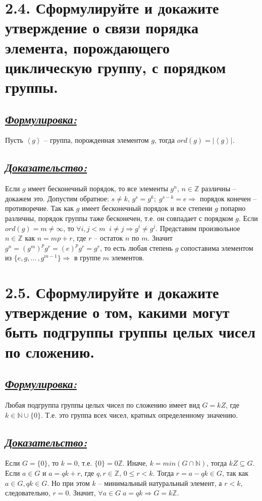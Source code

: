 \documentclass{article}
\begin{document}
\section*{\LARGE 2.4. Сформулируйте и докажите утверждение о связи порядка элемента, порождающего циклическую группу, с порядком группы.}
\subsection*{\Large \underline{\textit{Формулировка: }}}
Пусть $\left<g\right>$ -- группа, порожденная элементом $g$, тогда $ord(g) = |\left<g\right>|$.

\subsection*{\Large \underline{\textit{Доказательство: }}}
Если $g$ имеет бесконечный порядок, то все элементы $g^n,\, n \in \mathbb{Z}$ различны -- докажем это. Допустим обратное: $s \ne k,\, g^s = g^k;\; g^{s - k} = e \Rightarrow$ порядок конечен -- противоречие. Так как $g$ имеет бесконечный порядок и все степени $g$ попарно различны, порядок группы таже бесконечен, т.е. он совпадает с порядком $g$.
\newline Если $ord(g) = m \ne \infty$, то $\forall i, j < m \;\; i \ne j \Rightarrow g^i \ne g^j$. Представим произвольное $n \in \mathbb{Z}$ как $n = mp + r$, где $r$ -- остаток $n$ по $m$. Значит $g^n = (g^m)^pg^r = (e)^pg^r = g^r$, то есть любая степень $g$ сопоставима элементом из $\{e, g, ...\,, g^{m - 1}\} \Rightarrow$ в группе $m$ элементов.

\section*{\LARGE 2.5. Сформулируйте и докажите утверждение о том, какими могут быть подгруппы группы целых чисел по сложению. }
\subsection*{\Large \underline{\textit{Формулировка: }}}
Любая подгруппа группы целых чисел по сложению имеет вид $G = kZ$, где $k \in \mathbb{N}\cup\{0\}$. Т.е. это группа всех чисел, кратных определенному значению.

\subsection*{\Large \underline{\textit{Доказательство: }}}
Если $G = \{0\}$, то $k = 0$, т.е. $\{0\} = 0\mathbb{Z}$. 
\newline Иначе, $k = min(G \cap \mathbb{N})$, тогда $kZ \subseteq G$. Если $a \in G$ и $a = qk + r$, где 
\newline $q,r \in \mathbb{Z}, \,0 \le r < k$. Тогда $r = a - qk \in G$, так как $a \in G, qk \in G$. Но при этом $k$ -- минимальный натуральный элемент, а $r < k$, следовательно, $r = 0$. Значит, $\forall a \in G \; a = qk \Rightarrow G = k\mathbb{Z}$.
\end{document}

